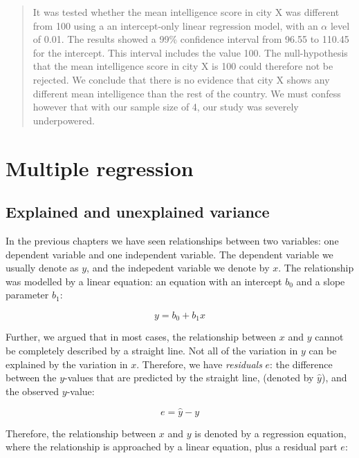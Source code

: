 \documentclass[]{book}\usepackage[]{graphicx}\usepackage[]{color}
\begin{document}
\begin{quote}
It was tested whether the mean intelligence score in city X was different from 100 using a an intercept-only linear regression model, with an $\alpha$ level of 0.01. The results showed a 99\% confidence interval from 96.55 to 110.45 for the intercept. This interval includes the value 100. The null-hypothesis that the mean intelligence score in city X is 100 could therefore not be rejected. We conclude that there is no evidence that city X shows any different mean intelligence than the rest of the country. We must confess however that with our sample size of 4, our study was severely underpowered. 
\end{quote}









\chapter{Multiple regression}\label{chap:multip}


\section{Explained and unexplained variance}

In the previous chapters we have seen relationships between two variables: one dependent variable and one independent variable. The dependent variable we usually denote as $y$, and the indepedent variable we denote by $x$. The relationship was modelled by a linear equation: an equation with an intercept $b_0$ and a slope parameter $b_1$:


\begin{equation}
y = b_0 + b_1 x
\end{equation}

Further, we argued that in most cases, the relationship between $x$ and $y$ cannot be completely described by a straight line. Not all of the variation in $y$ can be explained by the variation in $x$. Therefore, we have \textit{residuals} $e$: the difference between the $y$-values that are predicted by the straight line, (denoted by $\hat{y}$), and the observed $y$-value:

\begin{equation}
e = \hat{y} - y
\end{equation}

Therefore, the relationship between $x$ and $y$ is denoted by a regression equation, where the relationship is approached by a linear equation, plus a residual part $e$:
\end{document}
